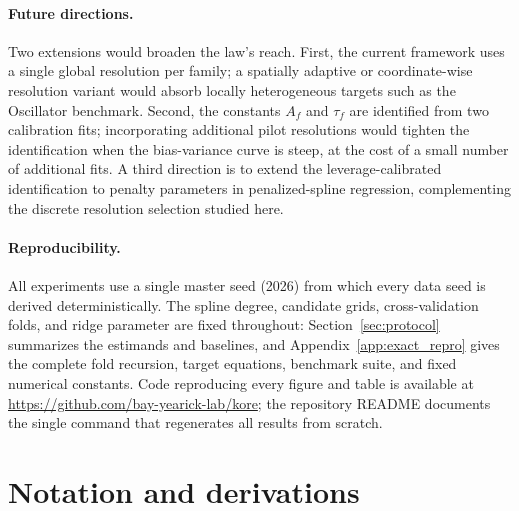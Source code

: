 \documentclass{article}
\begin{document}
\paragraph{Future directions.}
Two extensions would broaden the law's reach. First, the current framework uses a single global resolution per family; a spatially adaptive or coordinate-wise resolution variant would absorb locally heterogeneous targets such as the Oscillator benchmark. Second, the constants $A_f$ and $\tau_f$ are identified from two calibration fits; incorporating additional pilot resolutions would tighten the identification when the bias-variance curve is steep, at the cost of a small number of additional fits. A third direction is to extend the leverage-calibrated identification to penalty parameters in penalized-spline regression, complementing the discrete resolution selection studied here.

\paragraph{Reproducibility.}
All experiments use a single master seed (2026) from which every data seed is derived deterministically. The spline degree, candidate grids, cross-validation folds, and ridge parameter are fixed throughout: Section~\ref{sec:protocol} summarizes the estimands and baselines, and Appendix~\ref{app:exact_repro} gives the complete fold recursion, target equations, benchmark suite, and fixed numerical constants. Code reproducing every figure and table is available at \url{https://github.com/bay-yearick-lab/kore}; the repository README documents the single command that regenerates all results from scratch.




\appendix
\clearpage

\makeatletter
\renewcommand{\@seccntformat}[1]{%
  \@ifundefined{#1@cntformat}%
    {\csname the#1\endcsname\quad}%
    {\csname #1@cntformat\endcsname}}
\newcommand{\section@cntformat}{\appendixname~\thesection:\quad}
\makeatother


\section{Notation and derivations}
\label{app:derivations}
\end{document}
